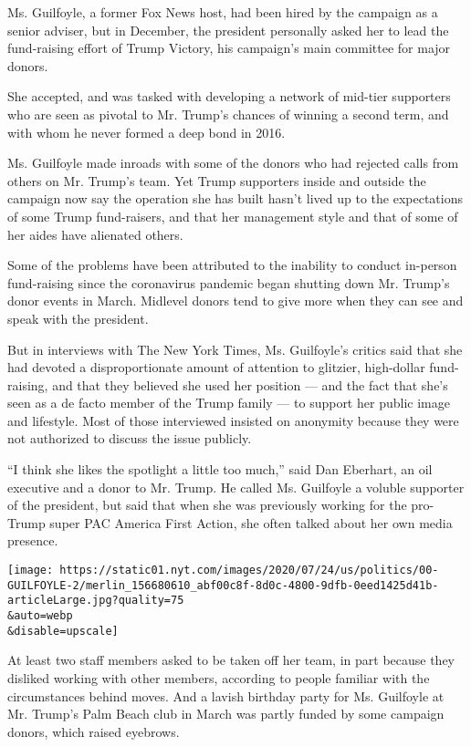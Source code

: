Ms. Guilfoyle, a former Fox News host, had been hired by the campaign as
a senior adviser, but in December, the president personally asked her to
lead the fund-raising effort of Trump Victory, his campaign's main
committee for major donors.

She accepted, and was tasked with developing a network of mid-tier
supporters who are seen as pivotal to Mr. Trump's chances of winning a
second term, and with whom he never formed a deep bond in 2016.

Ms. Guilfoyle made inroads with some of the donors who had rejected
calls from others on Mr. Trump's team. Yet Trump supporters inside and
outside the campaign now say the operation she has built hasn't lived up
to the expectations of some Trump fund-raisers, and that her management
style and that of some of her aides have alienated others.

Some of the problems have been attributed to the inability to conduct
in-person fund-raising since the coronavirus pandemic began shutting
down Mr. Trump's donor events in March. Midlevel donors tend to give
more when they can see and speak with the president.

But in interviews with The New York Times, Ms. Guilfoyle's critics said
that she had devoted a disproportionate amount of attention to glitzier,
high-dollar fund-raising, and that they believed she used her position
--- and the fact that she's seen as a de facto member of the Trump
family --- to support her public image and lifestyle. Most of those
interviewed insisted on anonymity because they were not authorized to
discuss the issue publicly.

``I think she likes the spotlight a little too much,'' said Dan
Eberhart, an oil executive and a donor to Mr. Trump. He called Ms.
Guilfoyle a voluble supporter of the president, but said that when she
was previously working for the pro-Trump super PAC America First Action,
she often talked about her own media presence.

\texttt{[image: https://static01.nyt.com/images/2020/07/24/us/politics/00-GUILFOYLE-2/merlin\_156680610\_abf00c8f-8d0c-4800-9dfb-0eed1425d41b-articleLarge.jpg?quality=75\\\&auto=webp\\\&disable=upscale]}

At least two staff members asked to be taken off her team, in part
because they disliked working with other members, according to people
familiar with the circumstances behind moves. And a lavish birthday
party for Ms. Guilfoyle at Mr. Trump's Palm Beach club in March was
partly funded by some campaign donors, which raised eyebrows.

